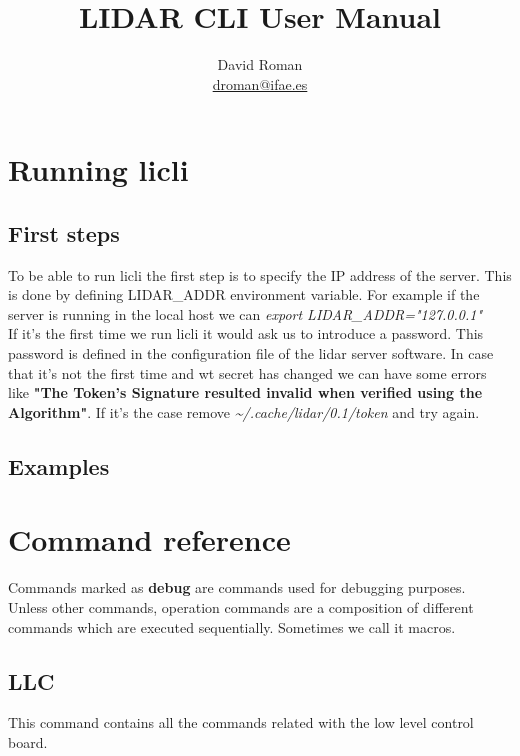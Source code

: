 \documentclass[letterpaper, 10 pt]{article}
\begin{document}
\title{LIDAR CLI User Manual}
\author{David Roman \\  \href{mailto:droman@ifae.es}{droman@ifae.es} }
\maketitle
\pagestyle{empty}
\newpage
\tableofcontents
\newpage
{}
\pagestyle{plain}

\section{Running licli}
\subsection{First steps}
To be able to run licli the first step is to specify the IP address of the server. This is done by defining LIDAR\_ADDR environment variable. For example if the server is running in the local host we can \emph{export LIDAR\_ADDR="127.0.0.1"}\\
\linebreak
If it's the first time we run licli it would ask us to introduce a password. This password is defined in the configuration file of the lidar server software. 
In case that it's not the first time and wt secret has changed we can have some errors like \textbf{"The Token's Signature resulted invalid when verified using the Algorithm"}. If it's the case remove \textit{\~{}/.cache/lidar/0.1/token} and try again.\\
\subsection{Examples}
\section{Command reference}
Commands marked as \textbf{debug} are commands used for debugging purposes.\\
\linebreak
Unless other commands, operation commands are a composition of different commands which are executed sequentially. Sometimes we call it macros.
\subsection{LLC}
This command contains all the commands related with the low level control board.
\end{document}
